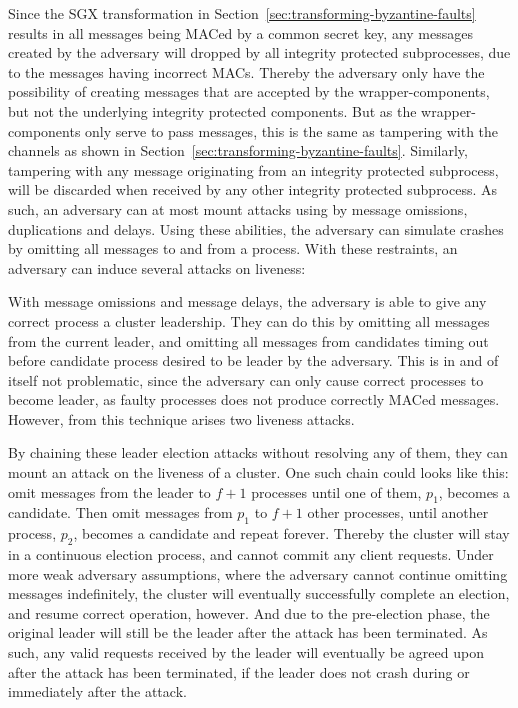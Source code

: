 \documentclass{article}
\begin{document}
		Since the SGX transformation in Section~\ref{sec:transforming-byzantine-faults} results in all messages being MACed by a common secret key, any messages created by the adversary will dropped by all integrity protected subprocesses, due to the messages having incorrect MACs.
        Thereby the adversary only have the possibility of creating messages that are accepted by the wrapper-components, but not the underlying integrity protected components.
        But as the wrapper-components only serve to pass messages, this is the same as tampering with the channels as shown in Section~\ref{sec:transforming-byzantine-faults}.
        Similarly, tampering with any message originating from an integrity protected subprocess, will be discarded when received by any other integrity protected subprocess.
        As such, an adversary can at most mount attacks using by message omissions, duplications and  delays.
        Using these abilities, the adversary can simulate crashes by omitting all messages to and from a process.
        With these restraints, an adversary can induce several attacks on liveness:

		With message omissions and message delays, the adversary is able to give any correct process a cluster leadership.
		They can do this by omitting all messages from the current leader, and omitting all messages from candidates timing out before candidate process desired to be leader by the adversary.
        This is in and of itself not problematic, since the adversary can only cause correct processes to become leader, as faulty processes does not produce correctly MACed messages.
        However, from this technique arises two liveness attacks.

		By chaining these leader election attacks without resolving any of them, they can mount an attack on the liveness of a cluster.
		One such chain could looks like this: omit messages from the leader to $f+1$ processes until one of them, $p_1$, becomes a candidate.
		Then omit messages from $p_1$ to $f+1$ other processes, until another process, $p_2$, becomes a candidate and repeat forever.
		Thereby the cluster will stay in a continuous election process, and cannot commit any client requests.
        Under more weak adversary assumptions, where the adversary cannot continue omitting messages indefinitely, the cluster will eventually successfully complete an election, and resume correct operation, however.
		And due to the pre-election phase, the original leader will still be the leader after the attack has been terminated.
		As such, any valid requests received by the leader will eventually be agreed upon after the attack has been terminated, if the leader does not crash during or immediately after the attack.
\end{document}
